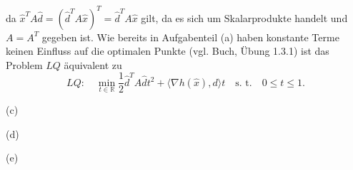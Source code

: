 \documentclass[ngerman, a4paper,12pt]{article}
\begin{document}
da $\hat{x}^TA\hat{d} = (\hat{d}^TA\hat{x})^T =  \hat{d}^TA\hat{x}$ gilt, da es sich um Skalarprodukte handelt und $A=A^T$ gegeben ist. Wie bereits in Aufgabenteil (a) haben konstante Terme keinen Einfluss auf die optimalen Punkte (vgl. Buch, Übung 1.3.1) ist das Problem $LQ$ äquivalent zu
\begin{equation*}
	LQ: \quad \min_{t \in \mathbb{R}} \frac{1}{2} \hat{d}^TA\hat{d}t^2 + \langle \nabla h(\hat{x}), d \rangle t \quad \text{s. t.} \quad 0\leq t \leq 1.
\end{equation*}
\par
(c) 
\par
(d) 
\par
(e)
\par
\end{document}
